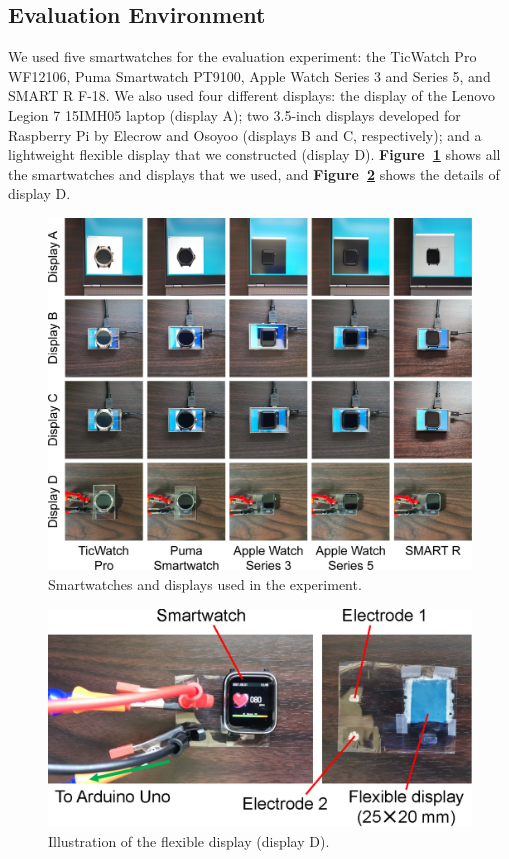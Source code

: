 \documentclass[sigchi,authordraft]{acmart}
\newcommand\figref[1]{\textbf{Figure~\ref{fig:#1}}}
\begin{document}
\subsection{Evaluation Environment}
We used five smartwatches for the evaluation experiment: the TicWatch Pro WF12106, Puma Smartwatch PT9100, Apple Watch Series 3 and Series 5, and SMART R F-18. We also used four different displays: the display of the Lenovo Legion 7 15IMH05 laptop (display A); two 3.5-inch displays developed for Raspberry Pi by Elecrow and Osoyoo (displays B and C, respectively); and a lightweight flexible display \cite{flexible_display} that we constructed (display D). \figref{smartwatches} shows all the smartwatches and displays that we used, and \figref{flexible} shows the details of display D.

\begin{figure}[!t]
  \centering
  \includegraphics[width=1\linewidth]{figures/smartwatches.eps}
  \caption{Smartwatches and displays used in the experiment.}
  \label{fig:smartwatches}
\end{figure}

\begin{figure}[!t]
  \centering
  \includegraphics[width=1\linewidth]{figures/flexible.eps}
  \caption{Illustration of the flexible display (display D).}
  \label{fig:flexible}
\end{figure}
\end{document}
